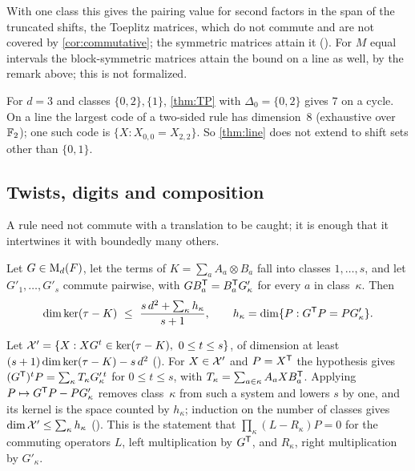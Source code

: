 With one class this gives the pairing value for second factors in the span of the truncated shifts, the Toeplitz
matrices, which do not commute and are not covered by \cref{cor:commutative}; the symmetric matrices attain it
(). For $M$ equal intervals the block-symmetric matrices attain the bound on a line
as well, by the remark above; this is not formalized.

\begin{remark}\label{rem:line-fails}
For $d=3$ and classes $\{0,2\},\{1\}$, \cref{thm:TP} with $\Delta_0=\{0,2\}$ gives $7$ on a cycle. On a line the largest
code of a two-sided rule has dimension~$8$ (exhaustive over $\mathbb{F}_2$); one such code is $\{X:X_{0,0}=X_{2,2}\}$. So
\cref{thm:line} does not extend to shift sets other than $\{0,1\}$.
\end{remark}

\subsection{Twists, digits and composition}

A rule need not commute with a translation to be caught; it is enough that it intertwines it with boundedly many others.

\begin{theorem}\label{thm:twist}
Let $G\in\mathrm{M}_d(F)$, let the terms of $K=\sum_aA_a\otimes B_a$ fall into classes $1,\dots,s$, and let
$G'_1,\dots,G'_s$ commute pairwise, with $GB_a^{\mathsf{T}}=B_a^{\mathsf{T}}G'_\kappa$ for every $a$ in class~$\kappa$. Then
\[
  \dim\ker(\sw-K)\ \le\ \frac{s\,d^2+\sum_\kappa h_\kappa}{s+1},\qquad h_\kappa=\dim\{P:G^{\tr}P=PG'_\kappa\}.
\]
\end{theorem}

\begin{outline}
Let $\mathcal{X}'=\{X:XG^t\in\ker(\tau-K),\ 0\le t\le s\}$, of dimension at least $(s+1)\dim\ker(\tau-K)-s\,d^2$
(). For $X\in\mathcal{X}'$ and $P=X^{\mathsf{T}}$ the hypothesis gives
$(G^{\mathsf{T}})^tP=\sum_\kappa T_\kappa G_\kappa'^{\,t}$ for $0\le t\le s$, with $T_\kappa=\sum_{a\in\kappa}A_aXB_a^{\mathsf{T}}$. Applying
$P\mapsto G^{\mathsf{T}}P-PG'_\kappa$ removes class~$\kappa$ from such a system and lowers $s$ by one, and its kernel is the
space counted by $h_\kappa$; induction on the number of classes gives $\dim\mathcal{X}'\le\sum_\kappa h_\kappa$
(). This is the statement that $\prod_\kappa(L-R_\kappa)P=0$ for the commuting
operators $L$, left multiplication by $G^{\mathsf{T}}$, and $R_\kappa$, right multiplication by $G'_\kappa$.
\end{outline}

